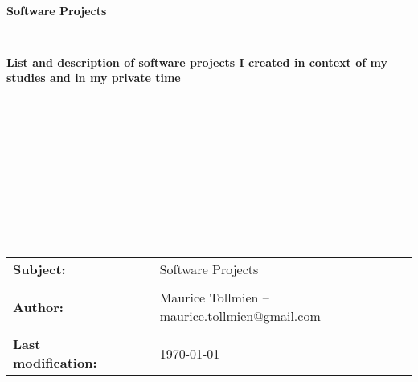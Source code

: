 \documentclass[a4paper, 12pt]{article}
\begin{document}
	
\thispagestyle{empty}



\begin{verbatim}





\end{verbatim}

\begin{center}
\textbf{\LARGE{Software Projects}}
\end{center}

\begin{verbatim}


\end{verbatim}

\begin{center}
\textbf{\large{List and description of software projects I created in context of my studies and in my private time}}
\end{center}

\begin{verbatim}












\end{verbatim}

\begin{flushleft}
\begin{tabular}{llll}

\textbf{Subject:}
& & & Software Projects
\\
\\
\textbf{Author:}
& & & Maurice Tollmien -- maurice.tollmien@gmail.com
\\
\\
\textbf{Last modification:}
& & & \today



\end{tabular}
\end{flushleft}


\newpage


\tableofcontents
\newpage

\end{document}
